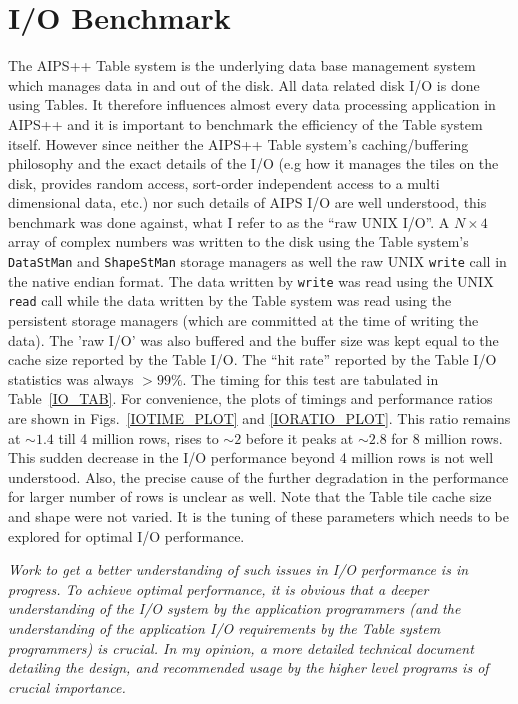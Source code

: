 
\section{I/O Benchmark}
\label{IOBenchmark}

The AIPS++ Table system is the underlying data base management system
which manages data in and out of the disk.  All data related disk I/O
is done using Tables.  It therefore influences almost every data
processing application in AIPS++ and it is important to benchmark the
efficiency of the Table system itself.  However since neither the
AIPS++ Table system's caching/buffering philosophy and the exact
details of the I/O (e.g how it manages the tiles on the disk, provides
random access, sort-order independent access to a multi dimensional
data, etc.) nor such details of AIPS I/O are well understood, this
benchmark was done against, what I refer to as the ``raw UNIX I/O''.
A $N\times4$ array of complex numbers was written to the disk using
the Table system's {\tt DataStMan} and {\tt ShapeStMan} storage
managers as well the raw UNIX {\tt write} call in the native endian
format.  The data written by {\tt write} was read using the UNIX {\tt
read} call while the data written by the Table system was read using
the persistent storage managers (which are committed at the time of
writing the data).  The 'raw I/O' was also buffered and the buffer
size was kept equal to the cache size reported by the Table I/O.  The
``hit rate'' reported by the Table I/O statistics was always $>99\%$.
The timing for this test are tabulated in Table~\ref{IO_TAB}.  For
convenience, the plots of timings and performance ratios are shown in
Figs.~\ref{IOTIME_PLOT} and \ref{IORATIO_PLOT}.  This ratio remains at
$\sim 1.4$ till 4 million rows, rises to $\sim 2$ before it peaks at
$\sim 2.8$ for 8 million rows.  This sudden decrease in the I/O
performance beyond 4 million rows is not well understood.  Also, the
precise cause of the further degradation in the performance for larger
number of rows is unclear as well.  Note that the Table
tile cache size and shape were not varied.  It is the tuning of these
parameters which needs to be explored for optimal I/O performance.

{\it Work to get a better understanding of such issues in I/O
performance is in progress.  To achieve optimal performance, it is
obvious that a deeper understanding of the I/O system by the
application programmers (and the understanding of the application I/O
requirements by the Table system programmers) is crucial. In my
opinion, a more detailed technical document detailing the design, and
recommended usage by the higher level programs is of crucial
importance.}


